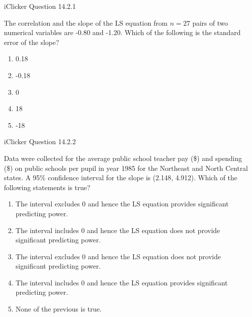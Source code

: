 \documentclass[14pt]{beamer}\usepackage[]{graphicx}\usepackage[]{color}
\begin{document}
\begin{frame}[fragile]{iClicker Question 14.2.1}

The correlation and the slope of the LS equation from $n = 27$ pairs of  two numerical variables are -0.80 and -1.20. Which of the following  is the standard error of the slope?

\begin{enumerate}[A]
\item 0.18
\item -0.18
\item 0
\item 18  
\item -18
\end{enumerate}
\end{frame}

\begin{frame}[fragile]{iClicker Question 14.2.2}

{\footnotesize{
Data were collected for the average public school teacher pay (\$) and  spending (\$) on public schools per pupil in year 1985 for the Northeast  and North Central states. A 95\% confidence interval for the slope is  (2.148, 4.912). Which of the following statements is true?

\begin{enumerate}[A]
\item The interval excludes 0 and hence the LS equation  provides significant predicting power.
\item The interval includes 0 and hence the LS equation does  not provide significant predicting power.
\item The interval excludes 0 and hence the LS equation does  not provide significant predicting power.
\item The interval includes 0 and hence the LS equation  provides significant predicting power.
\item None of the previous is true.
\end{enumerate}
}}

\end{frame}




%


\end{document}
